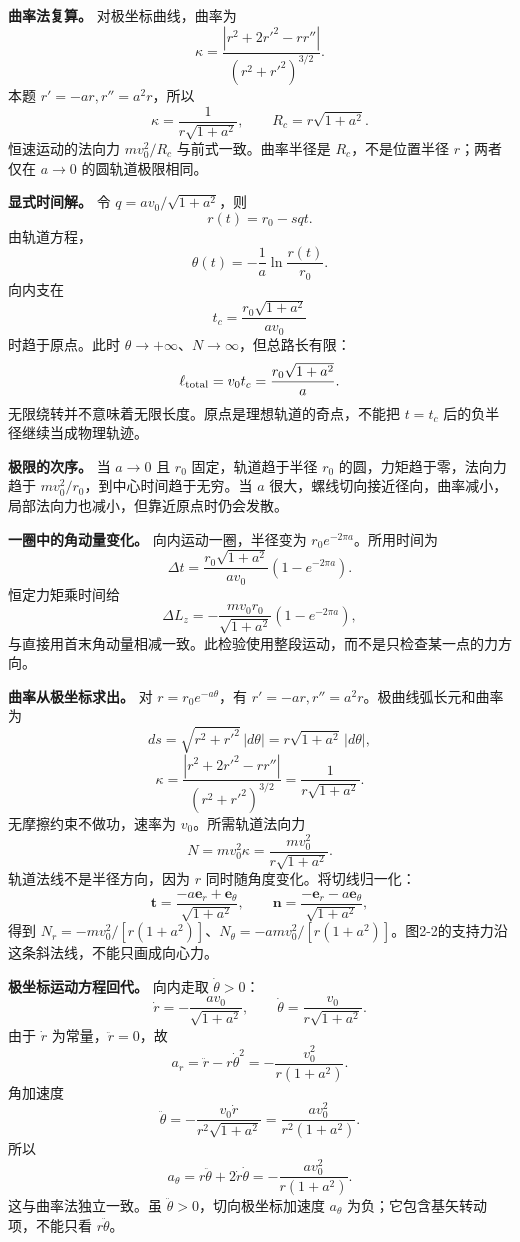 \documentclass[12pt,a4paper,UTF8]{ctexart}
\begin{document}
\textbf{曲率法复算。} 对极坐标曲线，曲率为 \[
\kappa=\frac{|r^2+2r'^2-rr''|}
{(r^2+r'^2)^{3/2}}.
\] 本题 \(r'=-ar,r''=a^2r\)，所以 \[
\kappa=\frac1{r\sqrt{1+a^2}},\qquad
R_c=r\sqrt{1+a^2}.
\] 恒速运动的法向力 \(mv_0^2/R_c\) 与前式一致。曲率半径是
\(R_c\)，不是位置半径 \(r\)；两者仅在 \(a\to0\) 的圆轨道极限相同。

\textbf{显式时间解。} 令 \(q=av_0/\sqrt{1+a^2}\)，则 \[
r(t)=r_0-sqt.
\] 由轨道方程， \[
\theta(t)=-\frac1a\ln\frac{r(t)}{r_0}.
\] 向内支在 \[
t_c=\frac{r_0\sqrt{1+a^2}}{av_0}
\] 时趋于原点。此时 \(\theta\to+\infty\)、\(N\to\infty\)，但总路长有限：
\[
\ell_{\rm total}=v_0t_c=
\frac{r_0\sqrt{1+a^2}}a.
\] 无限绕转并不意味着无限长度。原点是理想轨道的奇点，不能把 \(t=t_c\)
后的负半径继续当成物理轨迹。

\textbf{极限的次序。} 当 \(a\to0\) 且 \(r_0\) 固定，轨道趋于半径 \(r_0\)
的圆，力矩趋于零，法向力趋于 \(mv_0^2/r_0\)，到中心时间趋于无穷。当
\(a\)
很大，螺线切向接近径向，曲率减小，局部法向力也减小，但靠近原点时仍会发散。

\textbf{一圈中的角动量变化。} 向内运动一圈，半径变为
\(r_0e^{-2\pi a}\)。所用时间为 \[
\Delta t=\frac{r_0\sqrt{1+a^2}}{av_0}
(1-e^{-2\pi a}).
\] 恒定力矩乘时间给 \[
\Delta L_z=
-\frac{mv_0r_0}{\sqrt{1+a^2}}
(1-e^{-2\pi a}),
\]
与直接用首末角动量相减一致。此检验使用整段运动，而不是只检查某一点的力方向。

\textbf{曲率从极坐标求出。} 对 \(r=r_0e^{-a\theta}\)，有
\(r'=-ar,r''=a^2r\)。极曲线弧长元和曲率为 \[
ds=\sqrt{r^2+r'^2}\,|d\theta|
=r\sqrt{1+a^2}\,|d\theta|,
\] \[
\kappa=\frac{|r^2+2r'^2-rr''|}
{(r^2+r'^2)^{3/2}}
=\frac1{r\sqrt{1+a^2}}.
\] 无摩擦约束不做功，速率为 \(v_0\)。所需轨道法向力 \[
N=mv_0^2\kappa=\frac{mv_0^2}{r\sqrt{1+a^2}}.
\] 轨道法线不是半径方向，因为 \(r\) 同时随角度变化。将切线归一化： \[
\boldsymbol t=\frac{-a\boldsymbol e_r+\boldsymbol e_\theta}{\sqrt{1+a^2}},
\qquad
\boldsymbol n=\frac{-\boldsymbol e_r-a\boldsymbol e_\theta}{\sqrt{1+a^2}},
\] 得到
\(N_r=-mv_0^2/[r(1+a^2)]\)、\(N_\theta=-amv_0^2/[r(1+a^2)]\)。图2-2的支持力沿这条斜法线，不能只画成向心力。

\textbf{极坐标运动方程回代。} 向内走取 \(\dot\theta>0\)： \[
\dot r=-\frac{av_0}{\sqrt{1+a^2}},\qquad
\dot\theta=\frac{v_0}{r\sqrt{1+a^2}}.
\] 由于 \(\dot r\) 为常量，\(\ddot r=0\)，故 \[
a_r=\ddot r-r\dot\theta^2
=-\frac{v_0^2}{r(1+a^2)}.
\] 角加速度 \[
\ddot\theta=-\frac{v_0\dot r}{r^2\sqrt{1+a^2}}
=\frac{av_0^2}{r^2(1+a^2)}.
\] 所以 \[
a_\theta=r\ddot\theta+2\dot r\dot\theta
=-\frac{av_0^2}{r(1+a^2)}.
\] 这与曲率法独立一致。虽 \(\ddot\theta>0\)，切向极坐标加速度
\(a_\theta\) 为负；它包含基矢转动项，不能只看 \(r\ddot\theta\)。
\end{document}
